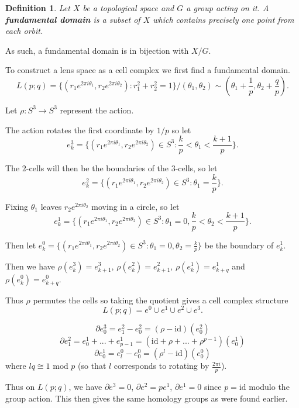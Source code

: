 \documentclass{article}
\newtheorem{definition}[theorem]{Definition}
\begin{document}
\begin{definition}
Let $X$ be a topological space and $G$ a group acting on it. A \textbf{fundamental domain} is a subset of $X$ which contains precisely one point from each orbit.
\end{definition}

\noindent As such, a fundamental domain is in bijection with $X/G$.

\noindent To construct a lens space as a cell complex we first find a fundamental domain.
\[L(p;q)=\{(r_1e^{2\pi i\theta_1},r_2e^{2\pi i\theta_2}):r_1^2+r_2^2=1\}/(\theta_1,\theta_2)\sim(\theta_1+\frac{1}{p},\theta_2+\frac{q}{p}).\]

\noindent Let $\rho\colon S^3\to S^3$ represent the action.

\noindent The action rotates the first coordinate by $1/p$ so let \[e_k^3=\{(r_1e^{2\pi i\theta_1},r_2e^{2\pi i\theta_2})\in S^3:\frac{k}{p}<\theta_1<\frac{k+1}{p}\}.\]

\noindent The $2$-cells will then be the boundaries of the $3$-cells, so let \[e_k^2=\{(r_1e^{2\pi i\theta_1},r_2e^{2\pi i\theta_2})\in S^3:\theta_1=\frac{k}{p}\}.\]

\noindent Fixing $\theta_1$ leaves $r_2e^{2\pi i\theta_2}$ moving in a circle, so let \[e_k^1=\{(r_1e^{2\pi i\theta_1},r_2e^{2\pi i\theta_2})\in S^3:\theta_1=0,\frac{k}{p}<\theta_2<\frac{k+1}{p}\}.\]

\noindent Then let $e_k^0=\{(r_1e^{2\pi i\theta_1},r_2e^{2\pi i\theta_2})\in S^3:\theta_1=0,\theta_2=\frac{k}{p}\}$ be the boundary of $e_k^1$.

\noindent Then we have $\rho(e_k^3)=e_{k+1}^3$, $\rho(e_k^2)=e_{k+1}^2$, $\rho(e_k^1)=e_{k+q}^1$ and $\rho(e_k^0)=e_{k+q}^0$.

\noindent Thus $\rho$ permutes the cells so taking the quotient gives a cell complex structure \[L(p;q)=e^0\cup e^1\cup e^2\cup e^3.\]

\[\partial e_0^3=e_1^2-e_0^2=(\rho-\text{id})(e_0^2)\]
\[\partial e_1^2=e_0^1+...+e_{p-1}^1=(\text{id}+\rho+...+\rho^{p-1})(e_0^1)\]
\[\partial e_0^1=e_l^0-e_0^0=(\rho^l-\text{id})(e_0^0)\] where $lq\cong1\text{ mod }p$ (so that $l$ corresponds to rotating by $\frac{2\pi i}{p}$).

\noindent Thus on $L(p;q)$, we have $\partial e^3=0$, $\partial e^2=pe^1$, $\partial e^1=0$ since $p=\text{id}$ modulo the group action. This then gives the same homology groups as were found earlier.
\end{document}
